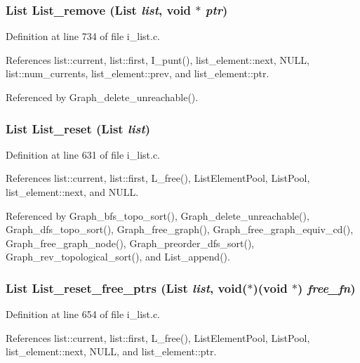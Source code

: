 \subsubsection{\setlength{\rightskip}{0pt plus 5cm}\bf{List} List\_\-remove (\bf{List} {\em list}, void $\ast$ {\em ptr})}\label{i__list_8h_ecdf7dfe2ee0a85daf3b6078d1dff1ba}




Definition at line 734 of file i\_\-list.c.

References list::current, list::first, I\_\-punt(), list\_\-element::next, NULL, list::num\_\-currents, list\_\-element::prev, and list\_\-element::ptr.

Referenced by Graph\_\-delete\_\-unreachable().
\subsubsection{\setlength{\rightskip}{0pt plus 5cm}\bf{List} List\_\-reset (\bf{List} {\em list})}\label{i__list_8h_8b86c31b4d78f4857f6d8f5567985ce8}




Definition at line 631 of file i\_\-list.c.

References list::current, list::first, L\_\-free(), List\-Element\-Pool, List\-Pool, list\_\-element::next, and NULL.

Referenced by Graph\_\-bfs\_\-topo\_\-sort(), Graph\_\-delete\_\-unreachable(), Graph\_\-dfs\_\-topo\_\-sort(), Graph\_\-free\_\-graph(), Graph\_\-free\_\-graph\_\-equiv\_\-cd(), Graph\_\-free\_\-graph\_\-node(), Graph\_\-preorder\_\-dfs\_\-sort(), Graph\_\-rev\_\-topological\_\-sort(), and List\_\-append().
\subsubsection{\setlength{\rightskip}{0pt plus 5cm}\bf{List} List\_\-reset\_\-free\_\-ptrs (\bf{List} {\em list}, void($\ast$)(void $\ast$) {\em free\_\-fn})}\label{i__list_8h_bb3ac291dc6e469487e2c9c36c39b0c5}




Definition at line 654 of file i\_\-list.c.

References list::current, list::first, L\_\-free(), List\-Element\-Pool, List\-Pool, list\_\-element::next, NULL, and list\_\-element::ptr.
